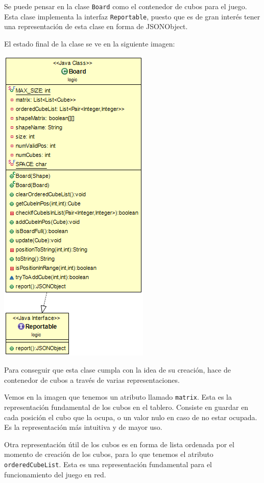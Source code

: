 \documentclass[12pt,a4paper,openright]{book}
\theoremstyle{break}
\begin{document}
Se puede pensar en la clase \texttt{Board} como el contenedor de cubos para el juego. Esta clase implementa la interfaz \texttt{Reportable}, puesto que es de gran interés tener una representación de esta clase en forma de JSONObject.

El estado final de la clase se ve en la siguiente imagen:

\begin{center}
\includegraphics[scale=0.75]{Board-final.png} 
\end{center}

Para conseguir que esta clase cumpla con la idea de su creación, hace de contenedor de cubos a través de varias representaciones.

Vemos en la imagen que tenemos un atributo llamado \texttt{matrix}. Esta es la representación fundamental de los cubos en el tablero. Consiste en guardar en cada posición el cubo que la ocupa, o un valor nulo en caso de no estar ocupada. Es la representación más intuitiva y de mayor uso.

Otra representación útil de los cubos es en forma de lista ordenada por el momento de creación de los cubos, para lo que tenemos el atributo \texttt{orderedCubeList}. Esta es una representación fundamental para el funcionamiento del juego en red.
\end{document}
